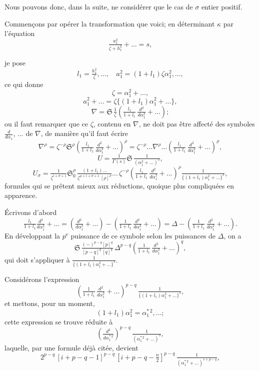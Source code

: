 \documentclass[12pt,a4paper]{article}
\providecommand{\fS}{\mathfrak{S}}
\begin{document}
Nous pouvons donc, dans la suite, ne consid\'erer que le cas de $\sigma$ entier positif.

Commen\c cons par op\'erer la transformation que voici; en d\'eterminant $\kappa$ par l'\'equation
\[
\tfrac{a_1^2}{\zeta + h_1^2} + \ldots = s,
\]

\newpage
\setcounter{page}{199}

je pose
\[
l_1 = \tfrac{h_1^2}{\zeta},\ldots,\quad a_1^2 = (1 + l_1)\zeta\alpha_1^2,\ldots,
\]
ce qui donne
\[
\zeta = \alpha_1^2 + \ldots,
\]
\[
a_1^2 + \ldots = \zeta\{(1 + l_1)\alpha_1^2 + \ldots\},
\]
\[
\nabla = \fS\,\tfrac{1}{\zeta}\left(\tfrac{l_1}{1 + l_1}\,\tfrac{d^2}{d\alpha_1^2} + \ldots\right);
\]
ou il faut remarquer que ce $\zeta$, contenu en $\nabla$, ne doit pas \^etre affect\'e des symboles $\tfrac{d}{d\alpha_1}$, $\ldots$ de $\nabla$, de mani\`ere qu'il faut \'ecrire
\[
\nabla^{\rho} = \zeta^{-\rho}\fS^{\rho}\left(\tfrac{l_1}{1 + l_1}\,\tfrac{d^2}{d\alpha_1^2} + \ldots\right)^{\rho} = \zeta^{-\rho}\ldots\nabla^{\rho}\ldots\left(\tfrac{l_1}{1 + l_1}\,\tfrac{d^2}{d\alpha_1^2} + \ldots\right)^{\rho},
\]
\[
U = \tfrac{1}{\Gamma(s)}\fS\,\tfrac{1}{(\alpha_1^2 + \ldots)^s},
\]
\[
U_{\sigma} = \tfrac{1}{\zeta^{i + \sigma + 1}}\fS^{\rho}_{0}\,\tfrac{(1 + l_1)\ldots}{\zeta^{\rho + i + \sigma + 1}\,[\rho]^{\rho}}\ldots\,\zeta^{-\rho}\left(\tfrac{l_1}{1 + l_1}\,\tfrac{d^2}{d\alpha_1^2} + \ldots\right)^{\rho}\tfrac{1}{\{(1 + l_1)\alpha_1^2 + \ldots\}^s},
\]
formules qui se pr\^etent mieux aux r\'eductions, quoique plus compliqu\'ees en apparence.

\'Ecrivons d'abord
\[
\tfrac{l_1}{1 + l_1}\tfrac{d^2}{d\alpha_1^2} + \ldots = \left(\tfrac{d^2}{d\alpha_1^2} + \ldots\right) - \left(\tfrac{1}{1 + l_1}\,\tfrac{d^2}{d\alpha_1^2} + \ldots\right) = \Delta - \left(\tfrac{1}{1 + l_1}\,\tfrac{d^2}{d\alpha_1^2} + \ldots\right).
\]
En d\'eveloppant la $p^{\text{e}}$ puissance de ce symbole selon les puissances de $\Delta$, on a
\[
\fS\,\tfrac{(-)^{p - q}[p]^q}{[p - q]^q\,[q]^q}\,\Delta^{p - q}\left(\tfrac{1}{1 + l_1}\,\tfrac{d^2}{d\alpha_1^2} + \ldots\right)^q,
\]
qui doit s'appliquer \`a $\tfrac{1}{\{(1 + l_1)\alpha_1^2 + \ldots\}^s}$.

Consid\'erons l'expression
\[
\left(\tfrac{1}{1 + l_1}\,\tfrac{d^2}{d\alpha_1^2} + \ldots\right)^{p - q}\,\tfrac{1}{\{(1 + l_1)\alpha_1^2 + \ldots\}^s},
\]
et mettons, pour un moment,
\[
(1 + l_1)\alpha_1^2 = \alpha_1^{*\,2},\ldots;
\]
cette expression se trouve r\'eduite \`a
\[
\left(\tfrac{d^2}{d\alpha_1^{*\,2}}\right)^{p - q}\,\tfrac{1}{(\alpha_1^{*\,2} + \ldots)^s},
\]
laquelle, par une formule d\'ej\`a cit\'ee, devient
\[
2^{p - q}\,[i + p - q - 1]^{p - q}\,[i + p - q - \tfrac{n}{2}]^{p - q}\,\tfrac{1}{(\alpha_1^{*\,2} + \ldots)^{s + p - q}},
\]
\end{document}
